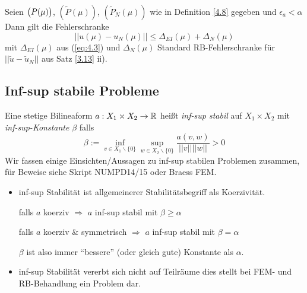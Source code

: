 \begin{kor}[EI-RB Fehlerschranke]
Seien $\big(P(\mu)\big)$, $(\tilde{P}(\mu))$, $(\tilde{P}_N(\mu))$ wie in Definition \ref{4.8} gegeben und $\epsilon_a < \alpha$ Dann gilt die Fehlerschranke
\[
	||u(\mu) - u_N(\mu) || \leq \Delta_{EI} (\mu) + \Delta_N (\mu)
\]
mit $\Delta_{EI} (\mu)$ aus (\ref{eq:4.3}) und $\Delta_N(\mu)$ Standard RB-Fehlerschranke für $||\tilde{u} - \tilde{u}_N||$ aus Satz \ref{3.13} ii).
\end{kor}

\subsection{Inf-sup stabile Probleme}

\begin{defn}
Eine stetige Bilineaform $a: X_1 \times X_2 \rightarrow \mathbb{R}$ heißt \emph{inf-sup stabil} auf $X_1 \times X_2$ mit \emph{inf-sup-Konstante} $\beta$ falls
\[
	\beta := \inf\limits_{v \in X_1 \backslash \{0\}} \sup\limits_{w \in X_2 \backslash \{0\}} \frac{a(v,w)}{||v|| ||w||} > 0
\]
Wir fassen einige Einsichten/Aussagen zu inf-sup stabilen Problemen zusammen, für Beweise siehe Skript NUMPD14/15 oder Braess FEM.
\end{defn}

\begin{bem} \beginwithlistbem
\begin{itemize}
	\item inf-sup Stabilität ist allgemeinerer Stabilitätsbegriff als Koerzivität.
	
	falls $a$ koerziv $\Rightarrow$ $a$ inf-sup stabil mit $\beta \geq \alpha$
	
	falls $a$ koerziv \& symmetrisch $\Rightarrow$ $a$ inf-sup stabil mit $\beta = \alpha$
	
	$\beta$ ist also immer ``bessere'' (oder gleich gute) Konstante als $\alpha$.
	\item inf-sup Stabilität vererbt sich nicht auf Teilräume dies stellt bei FEM- und RB-Behandlung ein Problem dar.
\end{itemize}
\end{bem}

